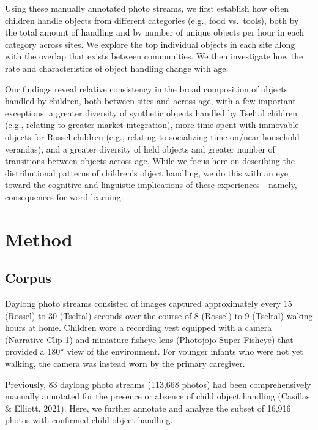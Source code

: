 \documentclass[10pt, letterpaper]{article}
\begin{document}
Using these manually annotated photo streams, we first establish how
often children handle objects from different categories (e.g., food
vs.~tools), both by the total amount of handling and by number of unique
objects per hour in each category across sites. We explore the top
individual objects in each site along with the overlap that exists
between communities. We then investigate how the rate and
characteristics of object handling change with age.

Our findings reveal relative consistency in the broad composition of
objects handled by children, both between sites and across age, with a
few important exceptions: a greater diversity of synthetic objects
handled by Tseltal children (e.g., relating to greater market
integration), more time spent with immovable objects for Rossel children
(e.g., relating to socializing time on/near household verandas), and a
greater diversity of held objects and greater number of transitions
between objects across age. While we focus here on describing the
distributional patterns of children's object handling, we do this with
an eye toward the cognitive and linguistic implications of these
experiences---namely, consequences for word learning.

\hypertarget{method}{%
\section{Method}\label{method}}

\hypertarget{corpus}{%
\subsection{Corpus}\label{corpus}}

Daylong photo streams consisted of images captured approximately every
15 (Rossel) to 30 (Tseltal) seconds over the course of 8 (Rossel) to 9
(Tseltal) waking hours at home. Children wore a recording vest equipped
with a camera (Narrative Clip 1) and miniature fisheye lens (Photojojo
Super Fisheye) that provided a 180\(\text{\textdegree}\) view of the
environment. For younger infants who were not yet walking, the camera
was instead worn by the primary caregiver.

Previously, 83 daylong photo streams (113,668 photos) had been
comprehensively manually annotated for the presence or absence of child
object handling (Casillas \& Elliott, 2021). Here, we further annotate
and analyze the subset of 16,916 photos with confirmed child object
handling.
\end{document}

